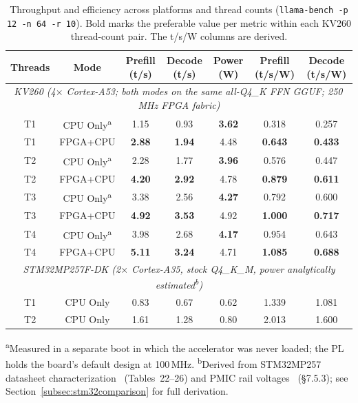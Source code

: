 \begin{table}[htbp]
\centering
\scriptsize
\caption{Throughput and efficiency across platforms and thread counts
(\texttt{llama-bench -p 12 -n 64 -r 10}). Bold marks the preferable value per metric
within each KV260 thread-count pair. The t/s/W columns are derived.}
\label{tab:short_results}
\setlength{\tabcolsep}{3pt}
\begin{tabular}{c c c c c c c}
\hline
Threads & Mode & Prefill (t/s) & Decode (t/s) & Power (W) & Prefill (t/s/W) & Decode (t/s/W) \\
\hline
\multicolumn{7}{c}{\itshape {KV260 (4$\times$ Cortex-A53; both modes on the same all-Q4\_K FFN GGUF; 250\,MHz FPGA fabric)}} \\
\hline
T1 & CPU Only\textsuperscript{a} & 1.15 & 0.93 & \textbf{3.62} & 0.318 & 0.257 \\
T1 & FPGA+CPU & \textbf{2.88} & \textbf{1.94} & 4.48 & \textbf{0.643} & \textbf{0.433} \\
\hline
T2 & CPU Only\textsuperscript{a} & 2.28 & 1.77 & \textbf{3.96} & 0.576 & 0.447 \\
T2 & FPGA+CPU & \textbf{4.20} & \textbf{2.92} & 4.78 & \textbf{0.879} & \textbf{0.611} \\
\hline
T3 & CPU Only\textsuperscript{a} & 3.38 & 2.56 & \textbf{4.27} & 0.792 & 0.600 \\
T3 & FPGA+CPU & \textbf{4.92} & \textbf{3.53} & 4.92 & \textbf{1.000} & \textbf{0.717} \\
\hline
T4 & CPU Only\textsuperscript{a} & 3.98 & 2.68 & \textbf{4.17} & 0.954 & 0.643 \\
T4 & FPGA+CPU & \textbf{5.11} & \textbf{3.24} & 4.71 & \textbf{1.085} & \textbf{0.688} \\
\hline
\multicolumn{7}{c}{\textit{STM32MP257F-DK (2$\times$ Cortex-A35, stock Q4\_K\_M, power analytically estimated\textsuperscript{b})}} \\
\hline
T1 & CPU Only & 0.83 & 0.67 & 0.62 & 1.339 & 1.081 \\
T2 & CPU Only & 1.61 & 1.28 & 0.80 & 2.013 & 1.600 \\
\hline
\end{tabular}

\par\vspace{4pt}
{\footnotesize
\textsuperscript{a}Measured in a separate boot in which the accelerator was never
loaded; the PL holds the board's default design at 100\,MHz.
\textsuperscript{b}Derived from STM32MP257 datasheet characterization~\cite{ds14284}
(Tables~22--26) and PMIC rail voltages~\cite{um3385} (\S7.5.3); see
Section~\ref{subsec:stm32comparison} for full derivation.}
\end{table}

